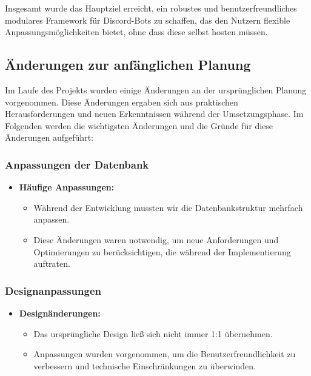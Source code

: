 Insgesamt wurde das Hauptziel erreicht, ein robustes und benutzerfreundliches modulares Framework für Discord-Bots zu schaffen, das den Nutzern flexible Anpassungsmöglichkeiten bietet, ohne dass diese selbst hosten müssen.

\subsection{Änderungen zur anfänglichen Planung}\label{uxe4nderungen-zur-anfuxe4nglichen-planung}

Im Laufe des Projekts wurden einige Änderungen an der ursprünglichen Planung vorgenommen. Diese Änderungen ergaben sich aus praktischen Herausforderungen und neuen Erkenntnissen während der Umsetzungsphase. Im Folgenden werden die wichtigsten Änderungen und die Gründe für diese Änderungen aufgeführt:

\subsubsection*{Anpassungen der Datenbank}

\begin{itemize}
    \item \textbf{Häufige Anpassungen:}
    \begin{itemize}
        \item Während der Entwicklung mussten wir die Datenbankstruktur mehrfach anpassen.
        \item Diese Änderungen waren notwendig, um neue Anforderungen und Optimierungen zu berücksichtigen, die während der Implementierung auftraten.
    \end{itemize}
\end{itemize}

\subsubsection*{Designanpassungen}

\begin{itemize}
    \item \textbf{Designänderungen:}
    \begin{itemize}
        \item Das ursprüngliche Design ließ sich nicht immer 1:1 übernehmen.
        \item Anpassungen wurden vorgenommen, um die Benutzerfreundlichkeit zu verbessern und technische Einschränkungen zu überwinden.
    \end{itemize}
\end{itemize}

